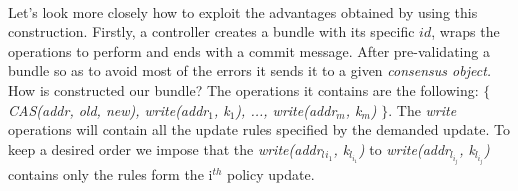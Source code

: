 \documentclass{article}
\theoremstyle{remark}
\begin{document}
\\
Let's look more closely how to exploit the advantages obtained by using this construction.
Firstly, a controller creates a bundle with its specific $id$, wraps the operations to perform and ends with a commit message. After pre-validating a bundle so as to avoid most of the errors it sends it to a given \emph{consensus object.} How is constructed our bundle? The operations it contains are the following: $\lbrace$ \emph{CAS(addr, old, new), write(addr$_1$, k$_1$), ..., write(addr$_m$, k$_m$)} $\rbrace$. The \emph{write} operations will contain all the update rules specified by the demanded update. To keep a desired order we impose that the 
\emph{write(addr$_l{_{i_1}}$, k$_{l_{i_1}}$)} to 
\emph{write(addr$_{l_{i_j}}$, k$_{l_{i_j}}$)} contains only the rules form the i$^{th}$ policy update.
  
\end{document}
